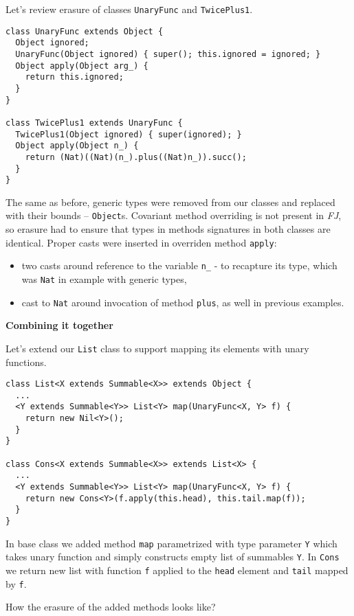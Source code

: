 \documentclass{article}[12pt]
\begin{document}
Let's review erasure of classes \texttt{UnaryFunc} and \texttt{TwicePlus1}.

\begin{verbatim}
class UnaryFunc extends Object {
  Object ignored;
  UnaryFunc(Object ignored) { super(); this.ignored = ignored; }
  Object apply(Object arg_) {
    return this.ignored;
  }
}

class TwicePlus1 extends UnaryFunc {
  TwicePlus1(Object ignored) { super(ignored); }
  Object apply(Object n_) {
    return (Nat)((Nat)(n_).plus((Nat)n_)).succ();
  }
}
\end{verbatim}

The same as before, generic types were removed from our classes and replaced with their bounds -- \texttt{Object}s. Covariant method overriding is not present in \emph{FJ}, so erasure had to ensure that types in methods signatures in both classes are identical. Proper casts were inserted in overriden method \texttt{apply}:

\begin{itemize}
\item two casts around reference to the variable \texttt{n\_} - to recapture its type, which was \texttt{Nat} in example with generic types,
\item cast to \texttt{Nat} around invocation of method \texttt{plus}, as well in previous examples.
\end{itemize}
\textbf{Combining it together}

Let's extend our \texttt{List} class to support mapping its elements with unary functions.

\begin{verbatim}
class List<X extends Summable<X>> extends Object {
  ...
  <Y extends Summable<Y>> List<Y> map(UnaryFunc<X, Y> f) {
    return new Nil<Y>();
  }
}

class Cons<X extends Summable<X>> extends List<X> {
  ...
  <Y extends Summable<Y>> List<Y> map(UnaryFunc<X, Y> f) {
    return new Cons<Y>(f.apply(this.head), this.tail.map(f));
  }
}
\end{verbatim}

In base class we added method \texttt{map} parametrized with type parameter \texttt{Y} which takes unary function and simply constructs empty list of summables \texttt{Y}. In \texttt{Cons} we return new list with function \texttt{f} applied to the \texttt{head} element and \texttt{tail} mapped by \texttt{f}.

How the erasure of the added methods looks like?
\end{document}
